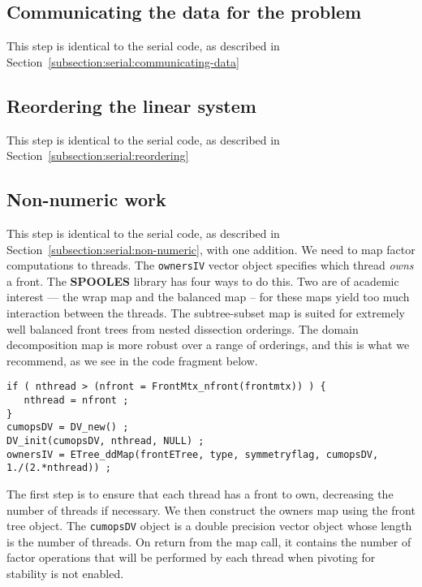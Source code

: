 \subsection{Communicating the data for the problem}
\label{subsection:MT:communicating-data}
\par
This step is identical to the serial code, as described in
Section~\ref{subsection:serial:communicating-data}
\par
\subsection{Reordering the linear system}
\label{subsection:MT:reordering}
This step is identical to the serial code, as described in
Section~\ref{subsection:serial:reordering}
\par
\subsection{Non-numeric work}
\label{subsection:MT:non-numeric}
This step is identical to the serial code, as described in
Section~\ref{subsection:serial:non-numeric}, with one addition.
We need to map factor computations to threads.
The {\tt ownersIV} vector object 
specifies which thread {\it owns} a front.
The {\bf SPOOLES} library has four ways to do this.
Two are of academic interest --- the wrap map and the balanced map
-- for these maps yield too much interaction between the threads.
The subtree-subset map is suited for extremely well balanced front
trees from nested dissection orderings.
The domain decomposition map is more robust over a range of
orderings, and this is what we recommend, as we see in the code
fragment below.
\begin{verbatim}
if ( nthread > (nfront = FrontMtx_nfront(frontmtx)) ) {
   nthread = nfront ;
}
cumopsDV = DV_new() ;
DV_init(cumopsDV, nthread, NULL) ;
ownersIV = ETree_ddMap(frontETree, type, symmetryflag, cumopsDV, 1./(2.*nthread)) ;
\end{verbatim}
The first step is to ensure that each thread has a front to own,
decreasing the number of threads if necessary.
We then construct the owners map using the front tree object.
The {\tt cumopsDV} object is a double precision vector object
whose length is the number of threads.
On return from the map call, it contains the number of factor
operations that will be performed by each thread when pivoting for
stability is not enabled.
\par
